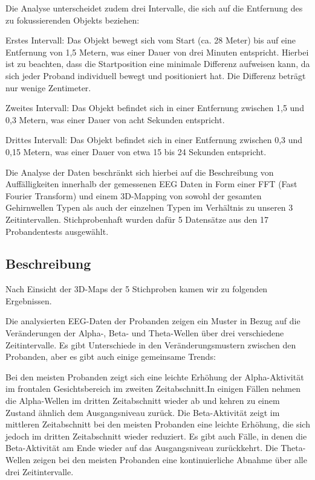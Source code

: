 \documentclass[conference]{IEEEtran}
\begin{document}
Die Analyse unterscheidet zudem drei Intervalle, die sich auf die Entfernung des zu fokussierenden Objekts beziehen:

\begin{myitemize}
    \item Erstes Intervall: Das Objekt bewegt sich vom Start (ca. 28 Meter) bis auf eine Entfernung von 1,5 Metern, was einer Dauer von drei Minuten entspricht. Hierbei ist zu beachten, dass die Startposition eine minimale Differenz aufweisen kann, da sich jeder Proband individuell bewegt und positioniert hat. Die Differenz beträgt nur wenige Zentimeter.
    \item Zweites Intervall: Das Objekt befindet sich in einer Entfernung zwischen 1,5 und 0,3 Metern, was einer Dauer von acht Sekunden entspricht.
    \item Drittes Intervall: Das Objekt befindet sich in einer Entfernung zwischen 0,3 und 0,15 Metern, was einer Dauer von etwa 15 bis 24 Sekunden entspricht.
\end{myitemize}

Die Analyse der Daten beschränkt sich hierbei auf die Beschreibung von Auffälligkeiten innerhalb der gemessenen EEG Daten in Form einer FFT (Fast Fourier Transform) und einem 3D-Mapping von sowohl der gesamten Gehirnwellen Typen als auch der einzelnen Typen im Verhältnis zu unseren 3 Zeitintervallen. Stichprobenhaft wurden dafür 5 Datensätze aus den 17 Probandentests ausgewählt. 


\subsection{Beschreibung}
Nach Einsicht der 3D-Maps der 5 Stichproben kamen wir zu folgenden Ergebnissen.

Die analysierten EEG-Daten der Probanden zeigen ein Muster in Bezug auf die Veränderungen der Alpha-, Beta- und Theta-Wellen über drei verschiedene Zeitintervalle. Es gibt Unterschiede in den Veränderungsmustern zwischen den Probanden, aber es gibt auch einige gemeinsame Trends:

Bei den meisten Probanden zeigt sich eine leichte Erhöhung der Alpha-Aktivität im frontalen Gesichtsbereich im zweiten Zeitabschnitt.In einigen Fällen nehmen die Alpha-Wellen im dritten Zeitabschnitt wieder ab und kehren zu einem Zustand ähnlich dem Ausgangsniveau zurück. Die Beta-Aktivität zeigt im mittleren Zeitabschnitt bei den meisten Probanden eine leichte Erhöhung, die sich jedoch im dritten Zeitabschnitt wieder reduziert. Es gibt auch Fälle, in denen die Beta-Aktivität am Ende wieder auf das Ausgangsniveau zurückkehrt. Die Theta-Wellen zeigen bei den meisten Probanden eine kontinuierliche Abnahme über alle drei Zeitintervalle.
\end{document}
